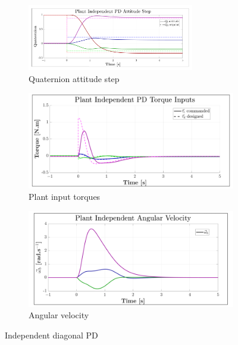 \begin{figure}[htbp]
\vspace{-17pt}
\centering
\begin{subfigure}{\textwidth}
\centering
\includegraphics[width=0.8\textwidth]{graphs/PD_Diagonal_Independent_Step}
\vspace{-10pt}
\caption{Quaternion attitude step}
\label{fig:PD_Diagonal_Independent_Step}
\end{subfigure}
\begin{subfigure}{0.49\textwidth}
\centering
\includegraphics[width=\textwidth]{graphs/PD_Diagonal_Independent_Torque}
\caption{Plant input torques}
\label{fig:PD_Diagonal_Independent_Torque}
\end{subfigure}
\begin{subfigure}{0.49\textwidth}
\centering
\includegraphics[width=\textwidth]{graphs/PD_Diagonal_Independent_Angular}
\caption{Angular velocity}
\label{fig:PD_Diagonal_Independent_Angular}
\end{subfigure}
\vspace{-8pt}
\caption{Independent diagonal PD}
\vspace{-7pt}
\end{figure}
